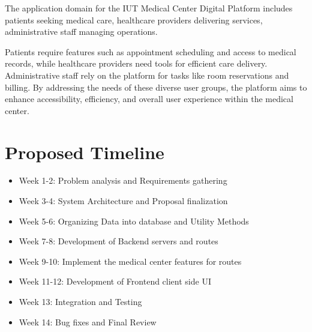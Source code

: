 \documentclass[11.5pt]{article}
\begin{document}
	The application domain for the IUT Medical Center Digital Platform includes patients seeking medical care, healthcare providers delivering services, administrative staff managing operations. \newline
	
	Patients require features such as appointment scheduling and access to medical records, while healthcare providers need tools for efficient care delivery. Administrative staff rely on the platform for tasks like room reservations and billing. By addressing the needs of these diverse user groups, the platform aims to enhance accessibility, efficiency, and overall user experience within the medical center.
	
	
	
	
	\section{Proposed Timeline}
	\begin{itemize}
		\item Week 1-2: Problem analysis and Requirements gathering
		\item Week 3-4: System Architecture and Proposal finalization
		\item Week 5-6: Organizing Data into database and Utility Methods
		\item Week 7-8: Development of Backend servers and routes
		\item Week 9-10: Implement the medical center features for routes
		\item Week 11-12: Development of Frontend client side UI
		\item Week 13: Integration and Testing
		\item Week 14: Bug fixes and Final Review
	\end{itemize}
	
	
	
\end{document}
